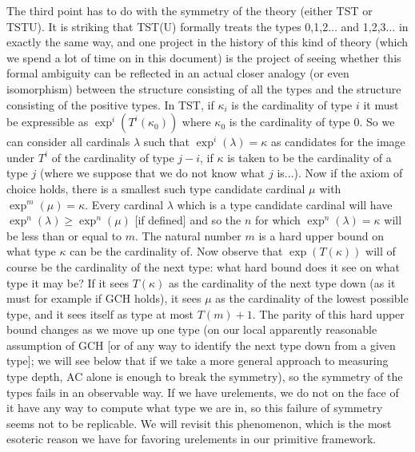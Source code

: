 \documentclass[12pt]{article}
\begin{document}
The third  point has to do with the symmetry of the theory (either TST or TSTU).  It is striking that TST(U) formally treats the types 0,1,2$\ldots$ and 1,2,3$\ldots$ in exactly the same way, and one project in the history of this kind of theory (which we spend a lot of time on in this document) is the project of seeing whether this formal ambiguity can be reflected in an actual closer analogy (or even isomorphism) between the structure consisting of all the types and the structure consisting of the positive types.  In TST,  if $\kappa_i$ is the cardinality of type $i$ it must be expressible as $\exp^i(T^i(\kappa_0))$ where $\kappa_0$ is the cardinality of type 0.  So we can consider all cardinals $\lambda$ such that $\exp^i(\lambda) = \kappa$ as candidates for the image under $T^i$ of the cardinality of type $j-i$, if $\kappa$ is taken to be the cardinality of a type $j$ (where we suppose that we do not know what $j$ is...).  Now if the axiom of choice holds, there is a smallest such type candidate cardinal $\mu$ with $\exp^m(\mu) = \kappa$.  Every cardinal $\lambda$ which is a type candidate cardinal will
have $\exp^n(\lambda) \geq \exp^n(\mu)$ [if defined] and so the $n$ for which $\exp^n(\lambda) = \kappa$ will be less than or equal to $m$.  The natural number $m$ is a hard upper bound on what type $\kappa$ can be the cardinality of.
Now observe that $\exp(T(\kappa))$ will of course be the cardinality of the next type:  what hard bound does it see on what type it may be?  If it sees $T(\kappa)$ as the cardinality of the next type down (as it must for example if GCH holds), it sees $\mu$ as the cardinality of the lowest possible type, and it sees itself as type at most $T(m)+1$.   The parity of this hard upper bound changes as we move up one type (on our local apparently reasonable assumption of GCH [or of any way to identify the next type down from a given type]; we will see below that if we take a more general approach to measuring type depth, AC alone is enough to break the symmetry), so the symmetry of the types fails in an observable way.  If we have urelements, we do not on the face of it have any way to compute what type we are in, so this failure of symmetry seems not to be replicable.  We will revisit this phenomenon, which is the most esoteric reason we have for favoring urelements in our primitive framework.
\end{document}
